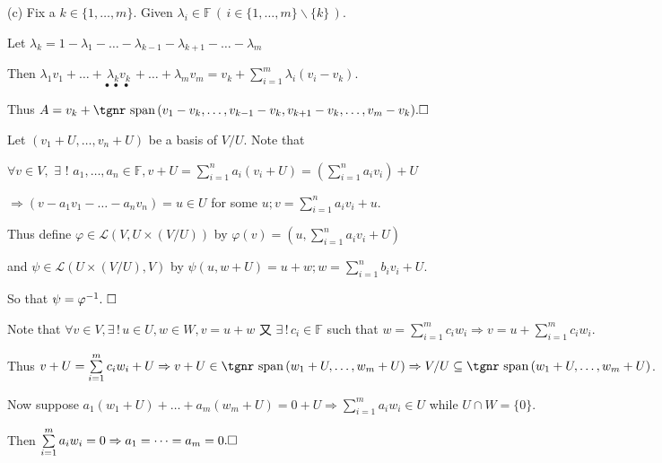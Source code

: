 \documentclass[a4paper, 11pt, UTF8]{article}
\def\Spn{{\textup{\tgnr span}}\,}
\def\Lm{\mathcal{L}}
\def\Fbb{{\mathbb{F}}}
\def\Hc{{\large\Blind{(c) }}}
\begin{document}
\begin{large}
\par\vspace{6pt}\quad
(c) Fix a $k\in\{1,\dots,m\}.$ Given $\lambda_i\in\Fbb\,(\,i\in\{1,\dots,m\}\backslash\{k\}\,).$\par\quad\Hc
Let $\lambda_k=1-\lambda_1-\dots-\lambda_{k-1}-\lambda_{k+1}-\dots-\lambda_m$\par\quad\Hc
Then $\lambda_1 v_1+\dots+\underset{\bullet\,\,\bullet\,\,\bullet\,\,}{\lambda_k v_k}+\dots+\lambda_m v_m=v_k+\sum\limits_{i=1}^m\lambda_i(v_i-v_k)$.\par\quad\Hc
Thus $A=v_k+\Spn(v_1-v_k,\dots,v_{k-1}-v_k,v_{k+1}-v_k,\dots,v_m-v_k).\hfill\square$\par
\SepLine\par

\par\quad
Let $(v_1+U,\dots,v_n+U)$ be a basis of $V/U$. Note that\par\quad
$\forall v\in V,\,\,\exists\,\,!\,\,a_1,\dots,a_n\in\Fbb,v+U=\sum\limits_{i=1}^n a_i(v_i+U)=(\sum\limits_{i=1}^n a_i v_i)+U$\par\quad
$\Rightarrow(v-a_1 v_1-\dots-a_n v_n)=u\in U$ for some $u;v=\sum\limits_{i=1}^n a_i v_i+u$.\par\quad
Thus define $\varphi\in\Lm\left(V,U\times(V/U)\right)$ by $\varphi(v)=(u,\sum\limits_{i=1}^n a_i v_i+U)$\par\qquad\qquad
and $\psi\in\Lm(U\times(V/U),V)$ by $\psi(u,w+U)=u+w;w=\sum\limits_{i=1}^n b_i v_i+U$.\par\quad
So that $\psi=\varphi^{-1}.\,\,\hfill\square$\par
\SepLine\par

\par\quad
Note that $\forall v\in V,\exists\,!\,u\in U,w\in W,v=u+w$ 又 $\exists\,!\,c_i\in\Fbb$ such that $w=\sum\limits_{i=1}^m c_i w_i\Rightarrow v=u+\sum\limits_{i=1}^m c_i w_i$.\par\quad
Thus $v+U=\sum\limits_{i=1}^m c_i w_i+U\Rightarrow v+U\in\Spn(w_1+U,\dots,w_m+U)\Rightarrow V/U\subseteq\Spn(w_1+U,\dots,w_m+U)$.\par\quad
Now suppose $a_1(w_1+U)+\dots+a_m(w_m+U)=0+U\Rightarrow\sum\limits_{i=1}^m a_i w_i\in U$ while $U\cap W=\{0\}$.\par\quad
Then $\sum\limits_{i=1}^m a_i w_i=0\Rightarrow a_1=\dots=a_m=0.\hfill\square$\par
\SepLine\par


\end{large}
\end{document}
